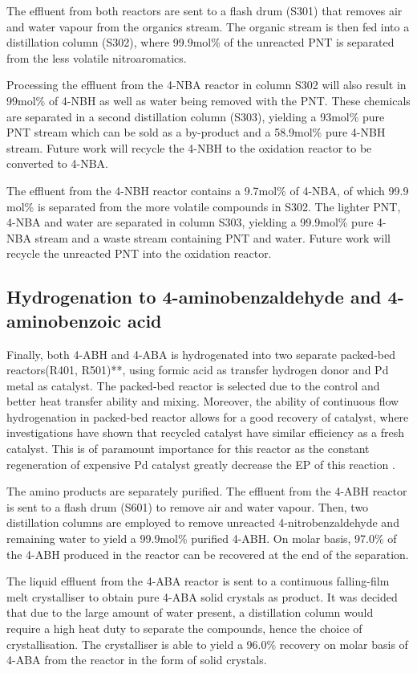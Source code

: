 The effluent from both reactors are sent to a flash drum (S301) that removes air and water vapour from the organics stream. The organic stream is then fed into a distillation column (S302), where 99.9mol\% of the unreacted PNT is separated from the less volatile nitroaromatics. 

Processing the effluent from the 4-NBA reactor in column S302 will also result in 99mol\% of 4-NBH as well as water being removed with the PNT. These chemicals are separated in a second distillation column (S303), yielding a 93mol\% pure PNT stream which can be sold as a by-product and a 58.9mol\% pure 4-NBH stream. Future work will recycle the 4-NBH to the oxidation reactor to be converted to 4-NBA.

The effluent from the 4-NBH reactor contains a 9.7mol\% of 4-NBA, of which 99.9 mol\% is separated from the more volatile compounds in S302. The lighter PNT,  4-NBA and water are separated in column S303, yielding a 99.9mol\% pure 4-NBA stream and a waste stream containing PNT and water. Future work will recycle the unreacted PNT into the oxidation reactor.

\subsection{Hydrogenation to 4-aminobenzaldehyde and 4-aminobenzoic acid}

Finally, both 4-ABH and 4-ABA is hydrogenated into two separate packed-bed reactors(R401, R501)**, using formic acid as transfer hydrogen donor and Pd metal as catalyst. The packed-bed reactor is selected due to the control and better heat transfer ability and mixing. Moreover, the ability of continuous flow hydrogenation in packed-bed reactor allows for a good recovery of catalyst, where investigations have shown that recycled catalyst have similar efficiency as a fresh catalyst. This is of paramount importance for this reactor as the constant regeneration of expensive Pd catalyst greatly decrease the EP of this reaction \cite{rahman_fast_2020}. 

The amino products are separately purified. The effluent from the 4-ABH reactor is sent to a flash drum (S601) to remove air and water vapour. Then, two distillation columns are employed to remove unreacted 4-nitrobenzaldehyde and remaining water to yield a 99.9mol\% purified 4-ABH. On molar basis, 97.0\% of the 4-ABH produced in the reactor can be recovered at the end of the separation.

The liquid effluent from the 4-ABA reactor is sent to a continuous falling-film melt crystalliser to obtain pure 4-ABA solid crystals as product. It was decided that due to the large amount of water present, a distillation column would require a high heat duty to separate the compounds, hence the choice of crystallisation. The crystalliser is able to yield a 96.0\% recovery on molar basis of 4-ABA from the reactor in the form of solid crystals.

